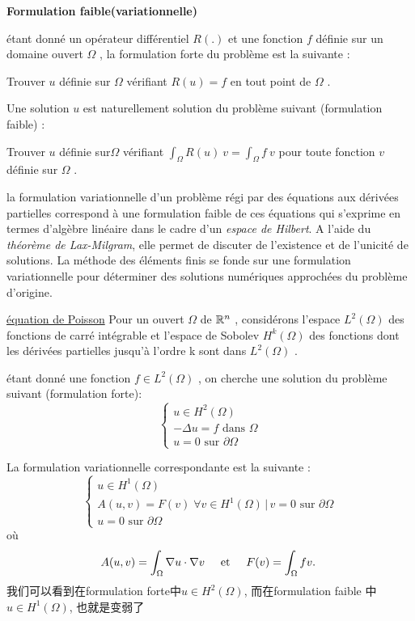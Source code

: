 \documentclass{article}
\begin{document}
\textbf{Formulation faible(variationnelle)}

\'etant donn\'e un op\'erateur diff\'erentiel $ \displaystyle R(.) $ et une fonction $ \displaystyle f $ d\'efinie sur un domaine ouvert $ \Omega$ , la formulation forte du probl\`eme est la suivante :

Trouver $\displaystyle u$ d\'efinie sur $ \Omega$  v\'erifiant $ \displaystyle R(u)=f $ en tout point de $ \Omega$ .

Une solution $ \displaystyle u$  est naturellement solution du probl\`eme suivant (formulation faible) :

Trouver $ \displaystyle u$  d\'efinie sur$  \Omega $ v\'erifiant $ \int_\Omega R(u)\ v = \int_\Omega f\ v $ pour toute fonction $ \displaystyle v$  d\'efinie sur $ \Omega$ .

la formulation variationnelle d'un probl\`eme r\'egi par des \'equations aux d\'eriv\'ees partielles correspond \`a une formulation faible de ces \'equations qui s'exprime en termes d'alg\`ebre lin\'eaire dans le cadre d'un \emph{espace de Hilbert}. A l'aide du \emph{th\'eor\`eme de Lax-Milgram}, elle permet de discuter de l'existence et de l'unicit\'e de solutions. La m\'ethode des \'el\'ements finis se fonde sur une formulation variationnelle pour d\'eterminer des solutions num\'eriques approch\'ees du probl\`eme d'origine.

\underline{\'equation de Poisson}\newline
Pour un ouvert $ \Omega$  de $ \mathbb{R}^n$ , consid\'erons l'espace $ L^2(\Omega) $ des fonctions de carr\'e int\'egrable et l'espace de Sobolev $ H^k(\Omega)$  des fonctions dont les d\'eriv\'ees partielles jusqu'\`a l'ordre k sont dans $ L^2(\Omega)$ .

\'etant donn\'e une fonction $ f \in L^2(\Omega)$ , on cherche une solution du probl\`eme suivant (formulation forte):
\begin{equation}
    \begin{cases} u \in H^2(\Omega) \\ -\Delta u = f \text{ dans } \Omega \\ u = 0 \text{ sur } \partial\Omega \end{cases}
\end{equation}

La formulation variationnelle correspondante est la suivante :
\begin{equation}
    \begin{cases} u \in H^1(\Omega) \\ A(u,v) = F(v) \; \forall v \in H^1(\Omega) \, | \, v = 0 \text{ sur } \partial\Omega \\ u = 0 \text{ sur } \partial\Omega \end{cases}
\end{equation}
où
$$
A(u,v) = \int_\Omega \nabla u \cdot \nabla v \hspace{0.5cm} \text{et} \hspace{0.5cm} F(v) = \int_\Omega fv.~
$$
我们可以看到在formulation forte中$u \in H^2(\Omega)$, 而在formulation faible 中$u \in H^1(\Omega)$, 也就是变弱了
\end{document}
